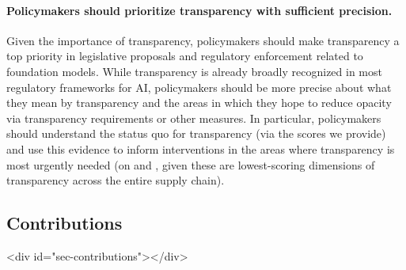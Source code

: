 \documentclass[screen, authorversion, acmsmall]{acmart}
\begin{document}
\paragraph{Policymakers should prioritize transparency with sufficient precision.}
Given the importance of transparency, policymakers should make transparency a top priority in legislative proposals and regulatory enforcement related to foundation models. 
While transparency is already broadly recognized in most regulatory frameworks for AI, policymakers should be more precise about what they mean by transparency and the areas in which they hope to reduce opacity via transparency requirements or other measures.
In particular, policymakers should understand the status quo for transparency (\eg via the scores we provide) and use this evidence to inform interventions in the areas where transparency is most urgently needed (\eg on \labor and \impact, given these are lowest-scoring dimensions of transparency across the entire supply chain). 
\clearpage
\hypertarget{contributions}{\subsection{Contributions}}
<div id="sec-contributions"></div>
\end{document}
